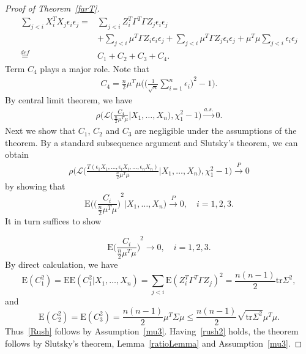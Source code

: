 \documentclass[review]{elsarticle}
\theoremstyle{plain}
\theoremstyle{definition}
\theoremstyle{remark}
\begin{document}
\begin{proof}[Proof of Theorem~\ref{farT}]
    \begin{equation*}
        \begin{aligned}
            \sum_{j<i} X_i^T X_j \epsilon_i\epsilon_j=&
            \sum_{j<i} Z_i^T \Gamma^T \Gamma Z_j \epsilon_i\epsilon_j\\
            &+
            \sum_{j<i} \mu^T \Gamma Z_i \epsilon_i\epsilon_j
            +\sum_{j<i} \mu^T \Gamma Z_j \epsilon_i\epsilon_j+
            \mu^T \mu \sum_{j<i} \epsilon_i\epsilon_j\\
            \overset{def}{=}&C_1+C_2+C_3+C_4.
        \end{aligned}
    \end{equation*}
Term $C_4$ plays a major role. Note that
    \begin{equation*}
        \begin{aligned}
            C_4=\frac{n}{2}\mu^T \mu\Big({\Big(\frac{1}{\sqrt{n}}\sum_{i=1}^n \epsilon_i\Big)}^2-1\Big).
        \end{aligned}
    \end{equation*}
By central limit theorem, we have
    \begin{equation*}
        \begin{aligned}
            \rho\Big(\mathcal{L}\Big(\frac{C_4}{\frac{n}{2}\mu^T \mu}\Big| X_1,\ldots,X_n\Big),\chi^2_1-1\Big)\xrightarrow{a.s.} 0.
        \end{aligned}
    \end{equation*}
Next we show that $C_1$, $C_2$ and $C_3$ are negligible under the assumptions of the theorem.
    By a standard subsequence argument and Slutsky's theorem, we can obtain
    \begin{equation}\label{rush2}
        \begin{aligned}
            \rho\Big(\mathcal{L}\Big(\frac{T(\epsilon_1 X_1,\ldots, \epsilon_i X_i,\ldots,\epsilon_n X_n)}{\frac{n}{2}\mu^T \mu}\Big| X_1,\ldots,X_n\Big),\chi^2_1-1\Big)\xrightarrow{P} 0
        \end{aligned}
    \end{equation}
    by showing that
    $$
    \mathrm{E}\Big({\Big(\frac{C_i}{\frac{n}{2}\mu^T\mu}\Big)}^2\Big|X_1,\ldots,X_n\Big)\xrightarrow{P} 0,\quad i=1,2,3.
    $$
    It in turn suffices to show

    \begin{equation}\label{Rush}
    \mathrm{E}{\Big(\frac{C_i}{\frac{n}{2}\mu^T\mu}\Big)}^2\to 0,
    \quad i=1,2,3.
    \end{equation}
    By direct calculation, we have
    $$\mathrm{E}(C_1^2)=\mathrm{E}\mathrm{E}(C_1^2|X_1,\ldots,X_n)=\sum_{j<i}\mathrm{E}{(Z_i^T \Gamma^T \Gamma Z_j)}^2=\frac{n(n-1)}{2}\mathrm{tr}\Sigma^2,$$
    and
    $$\mathrm{E}(C_2^2)=\mathrm{E}(C_3^2)=\frac{n(n-1)}{2}\mu^T \Sigma \mu\leq \frac{n(n-1)}{2}\sqrt{\mathrm{tr}\Sigma^2}\mu^T\mu.$$
    Thus~\eqref{Rush} follows by Assumption~\eqref{mu3}. Having~\eqref{rush2} holds, the theorem follows by Slutsky's theorem, Lemma~\ref{ratioLemma} and Assumption~\eqref{mu3}.
\end{proof}
\end{document}

